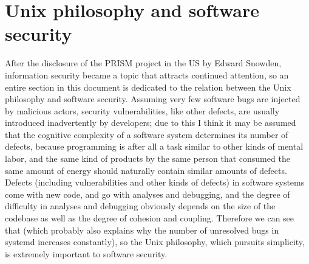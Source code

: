 \section{Unix philosophy and software security}\label{sec:security}

After the disclosure of the PRISM project in the US by Edward Snowden,
information security became a topic that attracts continued attention, so an
entire section in this document is dedicated to the relation between the Unix
philosophy and software security.  Assuming very few software bugs are injected
by malicious actors, security vulnerabilities, like other defects, are usually
introduced inadvertently by developers; due to this I think it may be assumed
that the cognitive complexity of a software system determines its number of
defects, because programming is after all a task similar to other kinds of
mental labor, and the same kind of products by the same person that consumed
the same amount of energy should naturally contain similar amounts of defects.
Defects (including vulnerabilities and other kinds of defects) in software
systems come with new code, and go with analyses and debugging, and the
degree of difficulty in analyses and debugging obviously depends on the size
of the codebase as well as the degree of cohesion and coupling.  Therefore we
can see that 
(which probably also explains why the number of unresolved bugs in systemd
increases constantly), so the Unix philosophy, which pursuits simplicity,
is extremely important to software security.


